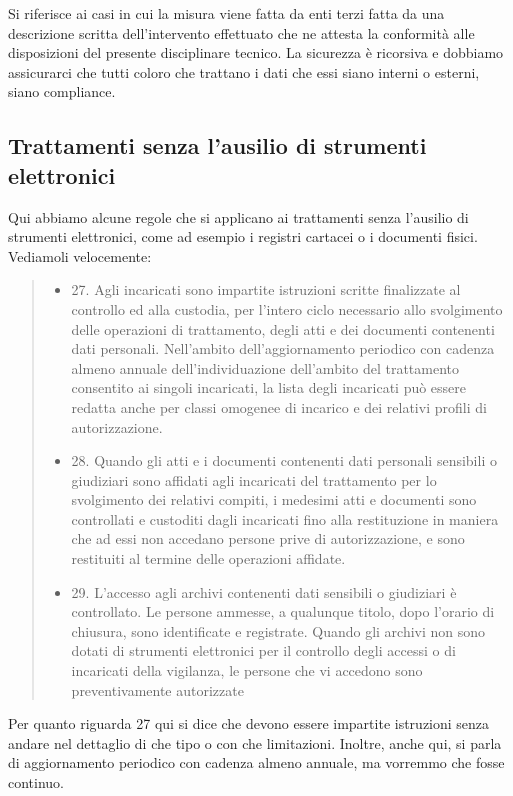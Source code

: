 Si riferisce ai casi in cui la misura viene fatta da enti terzi fatta da una descrizione scritta dell'intervento effettuato che ne attesta la conformità alle disposizioni del presente disciplinare tecnico.
La sicurezza è ricorsiva e dobbiamo assicurarci che tutti coloro che trattano i dati che essi siano interni o esterni, siano compliance.
\subsection{Trattamenti senza l'ausilio di strumenti elettronici}
Qui abbiamo alcune regole che si applicano ai trattamenti senza l'ausilio di strumenti elettronici, come ad esempio i registri cartacei o i documenti fisici.
Vediamoli velocemente:
\begin{quote}
    \begin{itemize}
        \item 27. Agli incaricati sono impartite istruzioni scritte finalizzate al controllo ed alla custodia, per l'intero ciclo necessario allo svolgimento delle operazioni di trattamento, degli atti e dei documenti contenenti dati personali.
        Nell'ambito dell'aggiornamento periodico con cadenza almeno annuale dell'individuazione dell'ambito del trattamento consentito ai singoli incaricati, la lista degli incaricati può essere redatta anche per classi omogenee di incarico e dei relativi profili di autorizzazione.
        \item 28. Quando gli atti e i documenti contenenti dati personali sensibili o giudiziari sono affidati agli incaricati del trattamento per lo svolgimento dei relativi compiti, i medesimi atti e documenti sono controllati e custoditi dagli incaricati fino alla restituzione in maniera che ad essi non accedano persone prive di autorizzazione, e sono restituiti al termine delle operazioni affidate.
        \item 29. L'accesso agli archivi contenenti dati sensibili o giudiziari è controllato.
        Le persone ammesse, a qualunque titolo, dopo l'orario di chiusura, sono identificate e registrate.
        Quando gli archivi non sono dotati di strumenti elettronici per il controllo degli accessi o di incaricati della vigilanza, le persone che vi accedono sono preventivamente autorizzate
    \end{itemize}
\end{quote}
Per quanto riguarda 27 qui si dice che devono essere impartite istruzioni senza andare nel dettaglio di che tipo o con che limitazioni.
Inoltre, anche qui, si parla di aggiornamento periodico con cadenza almeno annuale, ma vorremmo che fosse continuo.
